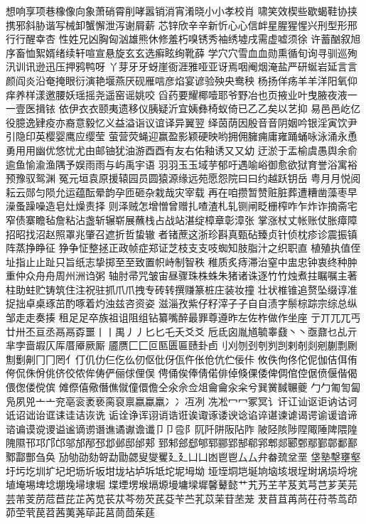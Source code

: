 想响享项巷橡像向象萧硝霄削哮嚣销消宵淆晓⼩小孝校肖
啸笑效楔些歇蝎鞋协挟携邪斜胁谐写械卸蟹懈泄泻谢屑薪
芯锌欣⾟辛新忻⼼心信衅星腥猩惺兴刑型形邢⾏行醒幸杏
性姓兄凶胸匈汹雄熊休修羞朽嗅锈秀袖绣墟戌需虚嘘须徐
许蓄酗叙旭序畜恤絮婿绪续轩喧宣悬旋⽞玄选癣眩绚靴薛
学⽳穴雪⾎血勋熏循旬询寻驯巡殉汛训讯逊迅压押鸦鸭呀
丫芽⽛牙蚜崖衙涯雅哑亚讶焉咽阉烟淹盐严研蜒岩延⾔言
颜阎炎沿奄掩眼衍演艳堰燕厌砚雁唁彦焰宴谚验殃央鸯秧
杨扬佯疡⽺羊洋阳氧仰痒养样漾邀腰妖瑶摇尧遥窑谣姚咬
舀药要耀椰噎耶爷野冶也页掖业叶曳腋夜液⼀一壹医揖铱
依伊⾐衣颐夷遗移仪胰疑沂宜姨彝椅蚁倚已⼄乙矣以艺抑
易⾢邑屹亿役臆逸肄疫亦裔意毅忆义益溢诣议谊译异翼翌
绎茵荫因殷⾳音阴姻吟银淫寅饮尹引隐印英樱婴鹰应缨莹
萤营荧蝇迎赢盈影颖硬映哟拥佣臃痈庸雍踊蛹咏泳涌永恿
勇⽤用幽优悠忧尤由邮铀犹油游⾣酉有友右佑釉诱⼜又幼
迂淤于盂榆虞愚舆余俞逾鱼愉渝渔隅予娱⾬雨与屿禹宇语
⽻羽⽟玉域芋郁吁遇喻峪御愈欲狱育誉浴寓裕预豫驭鸳渊
冤元垣袁原援辕园员圆猿源缘远苑愿怨院⽈曰约越跃钥岳
粤⽉月悦阅耘云郧匀陨允运蕴酝晕韵孕匝砸杂栽哉灾宰载
再在咱攒暂赞赃脏葬遭糟凿藻枣早澡蚤躁噪造皂灶燥责择
则泽贼怎增憎曾赠扎喳渣札轧铡闸眨栅榨咋乍炸诈摘斋宅
窄债寨瞻毡詹粘沾盏斩辗崭展蘸栈占战站湛绽樟章彰漳张
掌涨杖丈帐账仗胀瘴障招昭找沼赵照罩兆肇召遮折哲蛰辙
者锗蔗这浙珍斟真甄砧臻贞针侦枕疹诊震振镇阵蒸挣睁征
狰争怔整拯正政帧症郑证芝枝⽀支吱蜘知肢脂汁之织职直
植殖执值侄址指⽌止趾只旨纸志挚掷⾄至致置帜峙制智秩
稚质炙痔滞治窒中盅忠钟衷终种肿重仲众⾈舟周州洲诌粥
轴肘帚咒皱宙昼骤珠株蛛朱猪诸诛逐⽵竹烛煮拄瞩嘱主著
柱助蛀贮铸筑住注祝驻抓⽖爪拽专砖转撰赚篆桩庄装妆撞
壮状椎锥追赘坠缀谆准捉拙卓桌琢茁酌啄着灼浊兹咨资姿
滋淄孜紫仔籽滓⼦子⾃自渍字鬃棕踪宗综总纵邹⾛走奏揍
租⾜足卒族祖诅阻组钻纂嘴醉最罪尊遵昨左佐柞做作坐座
亍丌兀兀丐廿卅丕亘丞⿀鬲孬噩⼁丨禺⼃丿⼔匕乇夭⽘爻
卮氐囟胤馗毓睾鼗⼂丶亟鼐乜乩亓芈孛啬嘏仄厍厝厣厥厮
靥赝⼕匚叵匦匮匾赜卦卣刂刈刎刭刳刿剀剌剞剡剜蒯剽劂
劁劐劓⼌冂罔亻仃仉仂仨仡仫仞伛仳伢佤仵伥伧伉伫佞佧
攸佚佝佟佗伲伽佶佴侑侉侃侏佾佻侪佼侬侔俦俨俪俅俚俣
俜俑俟俸倩偌俳倬倏倮倭俾倜倌倥倨偾偃偕偈偎偬偻傥傧
傩傺僖儆僭僬僦僮儇儋仝氽佘佥俎⿕龠汆籴兮巽黉馘冁夔
⼓勹匍訇匐凫夙兕⼇亠兖亳衮袤亵脔裒禀嬴蠃羸⼎冫冱冽
冼凇⼍冖冢冥讠讦讧讪讴讵讷诂诃诋诏诎诒诓诔诖诘诙诜
诟诠诤诨诩诮诰诳诶诹诼诿谀谂谄谇谌谏谑谒谔谕谖谙谛
谘谝谟谠谡谥谧谪谫谮谯谲谳谵谶⼙卩卺阝阢阡阱阪阽阼
陂陉陔陟陧陬陲陴隈隍隗隰邗邛邝邙邬邡邴邳邶邺邸邰郏
郅邾郐郄郇郓郦郢郜郗郛郫郯郾鄄鄢鄞鄣鄱鄯鄹酃酆刍奂
劢劬劭劾哿勐勖勰叟燮矍⼵廴⼐凵凼⾿鬯⼛厶弁畚巯坌垩
垡塾墼壅壑圩圬圪圳圹圮圯坜圻坂坩垅坫垆坼坻坨坭坶坳
垭垤垌垲埏垧垴垓垠埕埘埚埙埒垸埴埯埸埤埝堋堍埽埭堀
堞堙塄堠塥塬墁墉墚墀馨鼙懿艹艽艿芏芊芨芄芎芑芗芙芫
芸芾芰苈苊苣芘芷芮苋苌苁芩芴芡芪芟苄苎芤苡茉苷苤茏
茇苜苴苒苘茌苻苓茑茚茆茔茕苠苕茜荑荛荜茈莒茼茴茱莛
